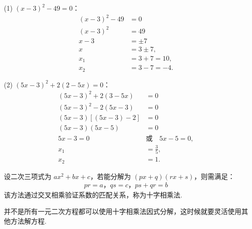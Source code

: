 \begin{solution}
\begin{multicols}{2}
(1) \((x-3)^2-49=0\)：
\begin{align*}
(x-3)^2 - 49 &= 0 \\
(x-3)^2 &= 49 \\
x-3 &= \pm 7 \\
x &= 3 \pm 7, \\
x_1 &= 3 + 7 = 10, \\
x_2 &= 3 - 7 = -4.
\end{align*}

(2) \((5x-3)^2+2(2-5x)=0\)：
\begin{align*}
(5x-3)^2 + 2(3-5x) &= 0 \\
(5x-3)^2 - 2(5x-3) &= 0 \\
(5x-3)\left[(5x-3) - 2\right] &= 0 \\
(5x-3)(5x-5) &= 0 \\
5x-3 = 0 \quad &\text{或} \quad 5x-5 = 0, \\
x_1 &= \frac{3}{5}, \\
x_2 &= 1.
\end{align*}
\end{multicols}
\end{solution}

设二次三项式为 $ax^2 + bx + c$，若能分解为 $(px + q)(rx + s)$，则需满足：
\begin{align*}
pr = a，
qs = c，ps + qr = b
\end{align*}
该方法通过交叉相乘验证系数的匹配关系，称为十字相乘法.
\par
并不是所有一元二次方程都可以使用十字相乘法因式分解，这时候就要灵活使用其他方法解方程.
